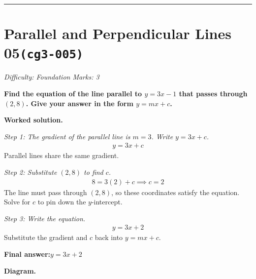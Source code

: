 \documentclass[11pt]{article}
\newcommand{\question}[1]{\par\medskip\noindent\textbf{#1}\par}
\begin{document}
\medskip\hrule

\section*{Parallel and Perpendicular Lines 05\quad\small\texttt{(cg3-005)}}
\textit{Difficulty: Foundation \quad\textbar\quad Marks: 3}

\question{Find the equation of the line parallel to \( y = 3x - 1 \) that passes through \( (2, 8) \). Give your answer in the form \( y = mx + c \).}

\textbf{Worked solution.}

\textit{Step 1: The gradient of the parallel line is \( m = 3 \). Write \( y = 3x + c \).}
\[\begin{gathered}
y = 3x + c
\end{gathered}\]
Parallel lines share the same gradient.

\textit{Step 2: Substitute \( (2, 8) \) to find \( c \).}
\[\begin{gathered}
8 = 3(2) + c \implies c = 2
\end{gathered}\]
The line must pass through \( (2, 8) \), so these coordinates satisfy the equation. Solve for \( c \) to pin down the \( y \)-intercept.

\textit{Step 3: Write the equation.}
\[\begin{gathered}
y = 3x + 2
\end{gathered}\]
Substitute the gradient and \( c \) back into \( y = mx + c \).

\begin{answerbox}
\textbf{Final answer:}\quad \(\displaystyle y = 3x + 2\)
\end{answerbox}
\textbf{Diagram.}
\end{document}
